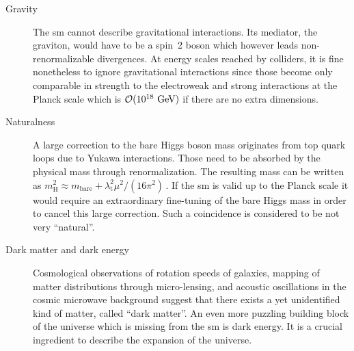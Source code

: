\begin{description}
\item[Gravity] The \gls{sm} cannot describe gravitational interactions. Its mediator, the graviton, would have to be a spin~2 boson which however leads non-renormalizable divergences. At energy scales reached by colliders, it is fine nonetheless to ignore gravitational interactions since those become only comparable in strength to the electroweak and strong interactions at the Planck scale which is $\mathcal{O}(10^{18}~\textrm{GeV})$ if there are no extra dimensions.
\item[Naturalness] A large correction to the bare Higgs boson mass originates from top quark loops due to Yukawa interactions. Those need to be absorbed by the physical mass through renormalization. The resulting mass can be written as $m^{2}_\mathrm{H}\approx m_\mathrm{bare}+\lambda_\mathrm{t}^{2}\mu^2/(16\pi^2)\,$. If the \gls{sm} is valid up to the Planck scale it would require an extraordinary fine-tuning of the bare Higgs mass in order to cancel this large correction. Such a coincidence is considered to be not very ``natural''.
\item[Dark matter and dark energy] Cosmological observations of rotation speeds of galaxies, mapping of matter distributions through micro-lensing, and acoustic oscillations in the cosmic microwave background suggest that there exists a yet unidentified kind of matter, called ``dark matter''. An even more puzzling building block of the universe which is missing from the \gls{sm} is dark energy. It is a crucial ingredient to describe the expansion of the universe.

\end{description}


